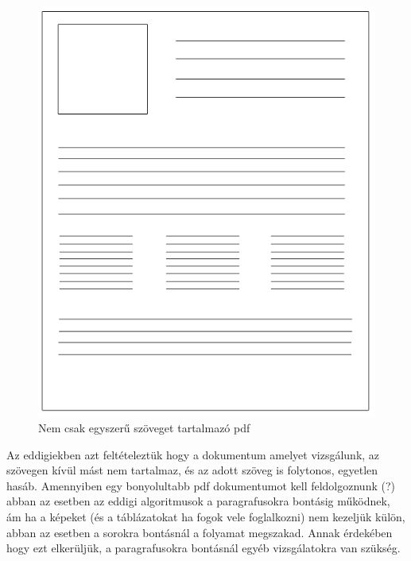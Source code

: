 \begin{figure}[H]
\centering
\includegraphics[scale=1]{images/page.png}
\caption{Nem csak egyszerű szöveget tartalmazó pdf}
\label{fig:page}
\end{figure}

Az eddigiekben azt feltételeztük hogy a dokumentum amelyet vizsgálunk, az szövegen kívül mást nem tartalmaz, és az adott szöveg is folytonos, egyetlen hasáb. Amennyiben egy bonyolultabb pdf dokumentumot kell feldolgoznunk (?) abban az esetben az eddigi algoritmusok a paragrafusokra bontásig működnek, ám ha a képeket (és a táblázatokat ha fogok vele foglalkozni) nem kezeljük külön, abban az esetben a sorokra bontásnál a folyamat megszakad. Annak érdekében hogy ezt elkerüljük, a paragrafusokra bontásnál egyéb vizsgálatokra van szükség.

